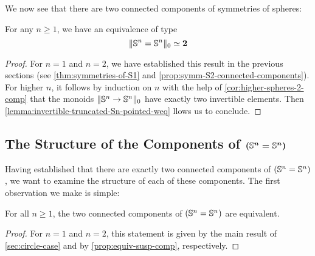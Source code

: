 \documentclass[english,a4]{article}
\newcommand{\setTrunc}[1]{\Trunc{#1}_0}
\begin{document}
We now see that there are two connected components of symmetries of spheres:
\begin{theorem} \label{thm:higher-spheres-2}
    For any $n \geq 1$, we have an equivalence of type
    \begin{equation}
    \higherTrunc 0 {\Sn n= \Sn n} \weq \bn 2
    \end{equation} 
\end{theorem}
\begin{proof}
  For $n = 1$ and $n=2$, we have established this result in the previous
  sections (see \cref{thm:symmetries-of-S1} and
  \cref{prop:symm-S2-connected-components}).  For higher $n$, it follows by
  induction on $n$ with the help of \cref{cor:higher-spheres-2-comp} that the
  monoids $\setTrunc{\Sn n \to \Sn n}$ have exactly two invertible elements.
  Then \cref{lemma:invertible-truncated-Sn-pointed-weq} llows us to conclude.
\end{proof}

\subsection{The Structure of the Components of $\boldsymbol{(\Sn n = \Sn n)}$}

Having established that there are exactly two connected components of $(\Sn n = \Sn n)$, we want to examine the structure of each of these components.
The first observation we make is simple:

\begin{proposition} \label{prop:general-case-conn-comp-equiv}
    For all $n \geq 1$, the two connected components of $(\Sn n = \Sn n)$ are equivalent.
\end{proposition}
\begin{proof}
    For $n=1$ and $n=2$, this statement is given by the main result of \cref{sec:circle-case} and by \cref{prop:equiv-susp-comp}, respectively.
\end{proof}
\end{document}
